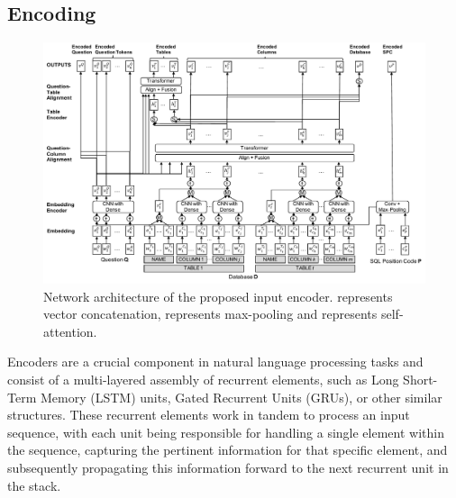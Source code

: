 \subsection{Encoding}
\label{sec:encoders}

\begin{figure}
    \centering
    \includegraphics[width=\textwidth]{pics/enc/fig_encode}
    \caption{Network architecture of the proposed input encoder.  represents vector concatenation,  represents max-pooling and  represents self-attention.\cite{choi_ryansql_2020}}
    \label{fig:encode}
\end{figure}

Encoders\cite{kumar2022deep} are a crucial component in natural language processing tasks and consist of a multi-layered assembly of recurrent elements, such as Long Short-Term Memory (LSTM) units, Gated Recurrent Units (GRUs), or other similar structures. These recurrent elements work in tandem to process an input sequence, with each unit being responsible for handling a single element within the sequence, capturing the pertinent information for that specific element, and subsequently propagating this information forward to the next recurrent unit in the stack.

